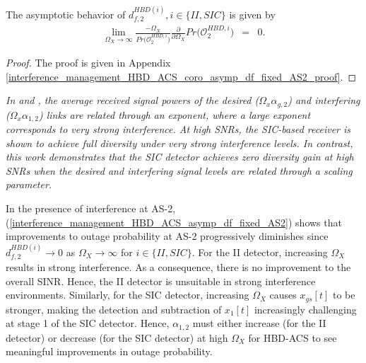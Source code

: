 \begin{corollary} \label{interference_management_HBD_ACS_coro_asymp_df_fixed_AS2}
The asymptotic behavior of $d_{f,2}^{HBD(i)}, i \in \{II,SIC\}$ is given by
\begin{eqnarray} \label{interference_management_HBD_ACS_asymp_df_fixed_AS2}
\lim_{\Omega_X\to\infty} \frac{-\Omega_X}{Pr\big(\mathcal{O}_{2}^{HBD,i}\big)}\frac{\partial}{\partial\Omega_X}Pr\big(\mathcal{O}_{2}^{HBD,i}\big) & = & 0.
\end{eqnarray}
\begin{proof}
The proof is given in Appendix \ref{interference_management_HBD_ACS_coro_asymp_df_fixed_AS2_proof}.
\end{proof}
\end{corollary}

\begin{remark}
\textit{In \cite{etkin2008gaussian} and \cite{sirigina2016symbol}, the average received signal powers of the desired ($\Omega_x \alpha_{g,2}$) and interfering ($\Omega_x \alpha_{1,2}$) links are related through an exponent, where a large exponent corresponds to very strong interference. At high SNRs, the SIC-based receiver is shown to achieve full diversity under very strong interference levels. In contrast, this work demonstrates that the SIC detector achieves zero diversity gain at high SNRs when the desired and interfering signal levels are related through a scaling parameter.}
\end{remark}

In the presence of interference at AS-2, (\ref{interference_management_HBD_ACS_asymp_df_fixed_AS2}) shows that improvements to outage probability at AS-2 progressively diminishes since $d_{f,2}^{HBD(i)} \to 0$ as $\Omega_X \to \infty$ for $i \in \{II,SIC\}$. For the II detector, increasing $\Omega_X$ results in strong interference. As a consequence, there is no improvement to the overall SINR. Hence, the II detector is unsuitable in strong interference environments. Similarly, for the SIC detector, increasing $\Omega_X$ causes $x_{gs}[t]$ to be stronger, making the detection and subtraction of $x_1[t]$ increasingly challenging at stage 1 of the SIC detector. Hence, $\alpha_{1,2}$ must either increase (for the II detector) or decrease (for the SIC detector) at high $\Omega_X$ for HBD-ACS to see meaningful improvements in outage probability.

